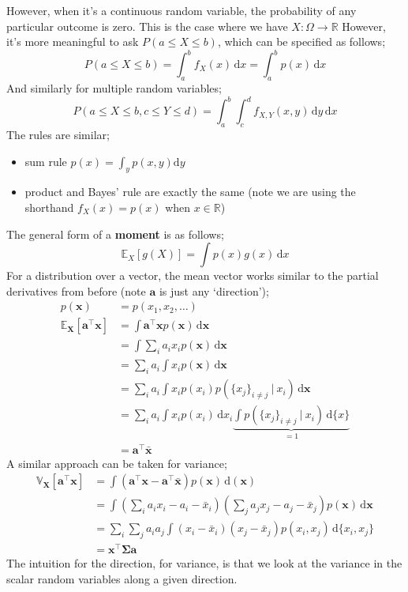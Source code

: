 \documentclass[a4paper, 12pt]{article}
\newcommand{\indefint}[2]{\int #1 \, \mathrm{d}#2}
\newcommand{\defint}[4]{\int_{#1}^{#2} #3 \, \mathrm{d}#4}
\newcommand{\summation}[2]{\sum\limits_{#1}^{#2}}
\newcommand{\mat}[1]{\boldsymbol{#1}}
\renewcommand{\vec}[1]{\boldsymbol{#1}}
\newcommand{\mbbr}[0]{\mathbb{R}}
\begin{document}
                However, when it's a continuous random variable, the probability of any particular outcome is zero.
                This is the case where we have $X : \Omega \to \mbbr$
                However, it's more meaningful to ask $P(a \leq X \leq b)$, which can be specified as follows;
                $$P(a \leq X \leq b) = \defint{a}{b}{f_X(x)}{x} = \defint{a}{b}{p(x)}{x}$$
                And similarly for multiple random variables;
                $$P(a \leq X \leq b, c \leq Y \leq d) = \defint{a}{b}{\defint{c}{d}{f_{X, Y}(x, y)}{y}}{x}$$
                The rules are similar;
                \begin{itemize}
                    \itemsep0em
                    \item sum rule \hfill $p(x) = \int_y p(x, y) \mathrm{d}y$
                    \item product and Bayes' rule are exactly the same (note we are using the shorthand $f_X(x) = p(x)$ when $x \in \mbbr$)
                \end{itemize}
                The general form of a \textbf{moment} is as follows;
                $$\mathbb{E}_X[g(X)] = \indefint{p(x)g(x)}{x}$$
                For a distribution over a vector, the mean vector works similar to the partial derivatives from before (note $\vec{a}$ is just any `direction');
                \begin{align*}
                    p(\vec{x}) & = p(x_1, x_2, \dots) \\
                    \mathbb{E}_{\vec{X}}[\vec{a}^\top\vec{x}] & = \indefint{\vec{a}^\top\vec{x}p(\vec{x})}{\vec{x}} \\
                    & = \indefint{\summation{i}{} a_i x_i p(\vec{x})}{\vec{x}} \\
                    & = \summation{i}{} a_i \indefint{x_i p(\vec{x})}{\vec{x}} \\
                    & = \summation{i}{} a_i \indefint{x_i p(x_i) p(\{x_j\}_{i \neq j}\ |\ x_i)}{\vec{x}} \\
                    & = \summation{i}{} a_i \indefint{x_i p(x_i)}{x_i} \underbrace{\indefint{p(\{x_j\}_{i \neq j}\ |\ x_i)}{\{x\}}}_{= 1} \\
                    & = \vec{a}^\top\vec{\bar{x}}
                \end{align*}
                A similar approach can be taken for variance;
                \begin{align*}
                    \mathbb{V}_{\vec{X}}[\vec{a}^\top\vec{x}] & = \indefint{(\vec{a}^\top\vec{x} - \vec{a}^\top\vec{\bar{x}})p(\vec{x})}(\vec{x}) \\
                    & = \indefint{\left(\summation{i}{} a_ix_i - a_i-\bar{x}_i\right)\left(\summation{j}{} a_jx_j - a_j-\bar{x}_j\right)p(\vec{x})}{\vec{x}} \\
                    & = \summation{i}{} \summation{j}{} a_i a_j \indefint{(x_i - \bar{x}_i)(x_j - \bar{x}_j)p(x_i, x_j)}{\{x_i, x_j\}} \\
                    & = \vec{x}^\top\mat{\Sigma}{\vec{a}}
                \end{align*}
                The intuition for the direction, for variance, is that we look at the variance in the scalar random variables along a given direction.
\end{document}
